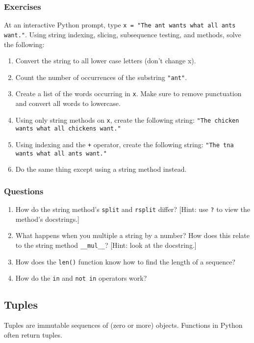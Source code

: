 \subsubsection{Exercises}
At an interactive Python prompt, type \texttt{x = "The ant wants what all ants want."}.
Using string indexing, slicing, subsequence testing, and methods, solve the following:
\begin{enumerate}
\item Convert the string to all lower case letters (don't change x).
\item Count the number of occurrences of the substring \texttt{"ant"}.
\item Create a list of the words occurring in \texttt{x}.  Make sure
  to remove punctuation and convert all words to lowercase.
\item Using only string methods on \texttt{x}, create the following string:
  \texttt{"The chicken wants what all chickens want."}
\item Using indexing and the \texttt{+} operator, create the following string:
  \texttt{"The tna wants what all ants want."}
\item Do the same thing except using a string method instead.
\end{enumerate}

\subsubsection{Questions}
\begin{enumerate}
\item How do the string method's \texttt{split} and \texttt{rsplit} differ?
  [Hint: use \texttt{?} to view the method's docstrings.]
\item What happens when you multiple a string by a number?  How does this
  relate to the string method \texttt{\_\_mul\_\_}?  [Hint: look at the
  docstring.]
\item How does the \texttt{len()} function know how to find the length of
  a sequence?
\item How do the \texttt{in} and \texttt{not in} operators work?
\end{enumerate}

\subsection{\label{subsec:tuples}Tuples}

Tuples are immutable sequences of (zero or more) objects. Functions in Python
often return tuples.

